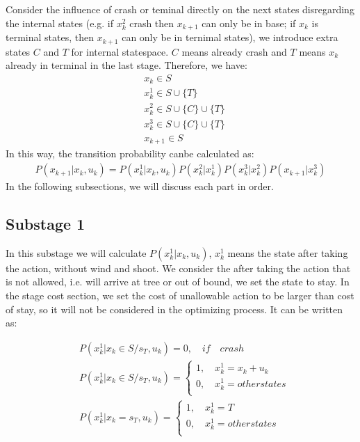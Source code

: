 \documentclass[fleqn,12pt, a4paper]{article}
\theoremstyle{definition}
\numberwithin{equation}{section}
\begin{document}
Consider the influence of crash or teminal directly on the next states disregarding the internal states (e.g. if $x_k^2$ crash then  $x_{k+1}$ can only be in base; if $x_k$ is terminal states, then $x_{k+1}$ can only be in ternimal states), we introduce extra states $C$ and $T$ for internal statespace. $C$ means already crash and $T$ means $x_k$ already in terminal in the last stage. Therefore, we have:
\begin{align*}
&x_k \in S\\
 &x_k^1 \in S\cup\{T\}\\
 &x_k^2 \in S\cup\{C\}\cup\{T\}\\
 &x_k^3 \in S\cup\{C\}\cup\{T\}\\
 &x_{k+1} \in S
\end{align*}
In this way, the transition probability canbe calculated as:
\begin{align*}
P(x_{k+1}|x_k,u_k) = P(x_k^1|x_k,u_k)P(x_k^2|x_k^1)P(x_k^3|x_k^2)P(x_{k+1}|x_k^3)
\end{align*}
In the following subsections, we will discuss each part in order.


\subsection{Substage 1}
In this substage we will calculate $P(x_k^1|x_k,u_k)$, $x_k^1$ means the state after taking the action, without wind and shoot. We consider the after taking the action that is not allowed, i.e. will arrive at tree or out of bound, we set the state to stay. In the stage cost section, we set the cost of unallowable action to be larger than cost of stay, so it will not be considered in the optimizing process. It can be written as:

\begin{align*}
&P(x_k^1|x_k\in S/s_T,u_k)=
0,\quad if\quad crash \\
&P(x_k^1|x_k\in S/s_T,u_k)=
\begin{cases}
1, \quad x_k^1=x_k+u_k\\
0, \quad x_k^1=otherstates\\
\end{cases}\\
&P(x_k^1|x_k=s_T, u_k)=
\begin{cases}
1, \quad x_k^1 = T \\
0, \quad x_k^1=otherstates\\
\end{cases}
\end{align*}
\end{document}
